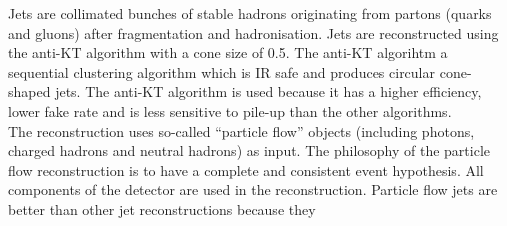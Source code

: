 Jets are collimated bunches of stable hadrons originating from partons (quarks
and gluons) after fragmentation and hadronisation. Jets are reconstructed using 
the anti-KT algorithm with a cone size of 0.5. The anti-KT algorihtm a
sequential clustering algorithm which is IR safe and produces circular
cone-shaped jets. The anti-KT algorithm is used because it has a higher 
efficiency, lower fake rate and is less sensitive to pile-up than the other 
algorithms. \\

The reconstruction uses so-called ``particle flow'' objects (including photons, 
charged hadrons and neutral hadrons) as input. The philosophy of the particle 
flow reconstruction is to have a complete and consistent event hypothesis. All 
components of the detector are used in the reconstruction. Particle flow jets 
are better than other jet reconstructions because they 
